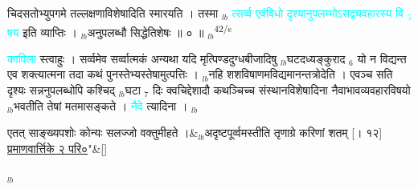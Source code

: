 \documentclass[article,12pt,a4paper]{memoir}%
\newcommand{\quotelemma}[1]{\textcolor{cyan}{#1}}
\newcounter{parCount}
\begin{document}
चिदसतोभ्युपगमे तल्लक्षणाविशेषादिति स्मारयति । तस्मा {\tiny $_{lb}$} \quotelemma{त्सर्व्व एवंविधो दृश्यानुपलम्भोऽसद्व्यवहारस्य वि {\tiny $_{5}$} षय} \cite[4a2]{vn-msN} इति व्याप्तिः । {\tiny $_{lb}$}अनुपलब्धौ सिद्धेतिशेषः ॥ ० ॥
	{}
	\pend%
      {\tiny $_{lb}$}\textsuperscript{\textenglish{42/s}}

	  
	  \pstart \leavevmode%
	\hphantom{.}\quotelemma{कापिला} स्त्वाहुः । सर्व्वमेव सर्व्वात्मकं अन्यथा यदि मृत्पिण्डदुग्धबीजादिषु {\tiny $_{lb}$}घटदध्यङ्कुराद {\tiny $_{6}$} यो न विद्यन्त एव शक्त्यात्मना तदा कथं पुनस्तेभ्यस्तेषामुत्पत्तिः । {\tiny $_{lb}$}नहि शशविषाणमविद्यमानन्तत्रोदेति । एवञ्च सति दृश्यः सन्ननुपलब्धोपि कश्चिद् {\tiny $_{lb}$}घटा {\tiny $_{7}$} दिः क्वचिद्देशादौ कथञ्चिच्च संस्थानविशेषादिना नैवाभावव्यवहारविषयो {\tiny $_{lb}$}भवतीति तेषां मतमासङ्कते । \quotelemma{नैवे} \cite[4a3]{vn-msN} त्यादिना ।
	{}
	\pend%
      {\tiny $_{lb}$}
	  \bigskip
	  \begingroup
	
	    
	    \stanza[\smallbreak]
	  एतत् साङ्ख्यपशोः कोन्यः सलज्जो वक्तुमीहते ।&{\tiny $_{lb}$}अदृष्टपूर्व्वमस्तीति तृणाग्रे करिणां शतम् [। १२] \href{http://sarit.indology.info/?cref=pv.2.0}{प्रमाणवार्त्तिके २ परि०}{\normalfontlatin\large\qquad{}"}\&[\smallbreak]
	  
	  
	  
	  \endgroup
	{\tiny $_{lb}$}
\end{document}

